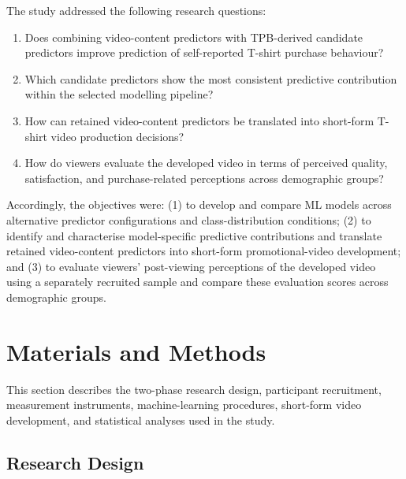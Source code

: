\documentclass[jtaer,article,submit,moreauthors]{Definitions/mdpi}
\begin{document}
The study addressed the following research questions:
\begin{enumerate}
\item Does combining video-content predictors with TPB-derived candidate predictors improve prediction of self-reported T-shirt purchase behaviour?
\item Which candidate predictors show the most consistent predictive contribution within the selected modelling pipeline?
\item How can retained video-content predictors be translated into short-form T-shirt video production decisions?
\item How do viewers evaluate the developed video in terms of perceived quality, satisfaction, and purchase-related perceptions across demographic groups?
\end{enumerate}

Accordingly, the objectives were: (1) to develop and compare ML models
across alternative predictor configurations and class-distribution
conditions; (2) to identify and characterise model-specific predictive
contributions and translate retained video-content predictors into short-form
promotional-video development; and (3) to evaluate viewers' post-viewing
perceptions of the developed video using a separately recruited sample and
compare these evaluation scores across demographic groups.

\section{Materials and Methods}
This section describes the two-phase research design, participant recruitment, measurement instruments, machine-learning procedures, short-form video development, and statistical analyses used in the study.

\subsection{Research Design}
\end{document}
